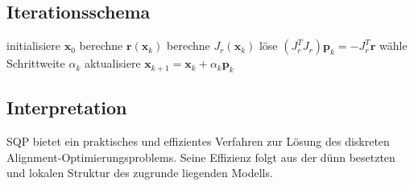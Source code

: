 \subsection{Iterationsschema}
\begin{algorithm}
\caption{SQP-Iteration}
\begin{algorithmic}
\State initialisiere $\mathbf{x}_0$
  \State berechne $\mathbf r(\mathbf x_k)$
  \State berechne $J_r(\mathbf x_k)$
  \State löse $(J_r^T J_r)\mathbf p_k=-J_r^T\mathbf r$
  \State wähle Schrittweite $\alpha_k$
  \State aktualisiere $\mathbf x_{k+1}=\mathbf x_k+\alpha_k\mathbf p_k$
\EndFor
\end{algorithmic}
\end{algorithm}

\subsection{Interpretation}
\begin{summary}
SQP bietet ein praktisches und effizientes Verfahren zur Lösung des diskreten
Alignment-Optimierungsproblems. Seine Effizienz folgt aus der dünn besetzten
und lokalen Struktur des zugrunde liegenden Modells.
\end{summary}
